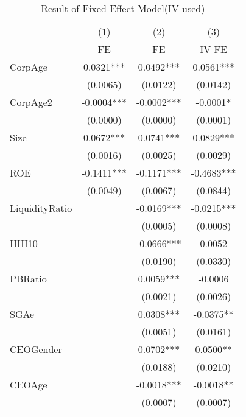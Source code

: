 \begin{table}[htbp]\centering
\def\sym#1{\ifmmode^{#1}\else\(^{#1}\)\fi}
\caption{Result of Fixed Effect Model(IV used) \label{tab:regressionFE}}
\begin{tabular}{l*{3}{c}}
\hline\hline
            &\multicolumn{1}{c}{(1)}&\multicolumn{1}{c}{(2)}&\multicolumn{1}{c}{(3)}\\
            &\multicolumn{1}{c}{FE}&\multicolumn{1}{c}{FE}&\multicolumn{1}{c}{IV-FE}\\
\hline
CorpAge     &      0.0321***&      0.0492***&      0.0561***\\
            &    (0.0065)   &    (0.0122)   &    (0.0142)   \\
[1em]
CorpAge2    &     -0.0004***&     -0.0002***&     -0.0001*  \\
            &    (0.0000)   &    (0.0000)   &    (0.0001)   \\
[1em]
Size        &      0.0672***&      0.0741***&      0.0829***\\
            &    (0.0016)   &    (0.0025)   &    (0.0029)   \\
[1em]
ROE         &     -0.1411***&     -0.1171***&     -0.4683***\\
            &    (0.0049)   &    (0.0067)   &    (0.0844)   \\
[1em]
LiquidityRatio&               &     -0.0169***&     -0.0215***\\
            &               &    (0.0005)   &    (0.0008)   \\
[1em]
HHI10       &               &     -0.0666***&      0.0052   \\
            &               &    (0.0190)   &    (0.0330)   \\
[1em]
PBRatio     &               &      0.0059***&     -0.0006   \\
            &               &    (0.0021)   &    (0.0026)   \\
[1em]
SGAe        &               &      0.0308***&     -0.0375** \\
            &               &    (0.0051)   &    (0.0161)   \\
[1em]
CEOGender   &               &      0.0702***&      0.0500** \\
            &               &    (0.0188)   &    (0.0210)   \\
[1em]
CEOAge      &               &     -0.0018***&     -0.0018** \\
            &               &    (0.0007)   &    (0.0007)   \\

\end{tabular}
\end{table}
